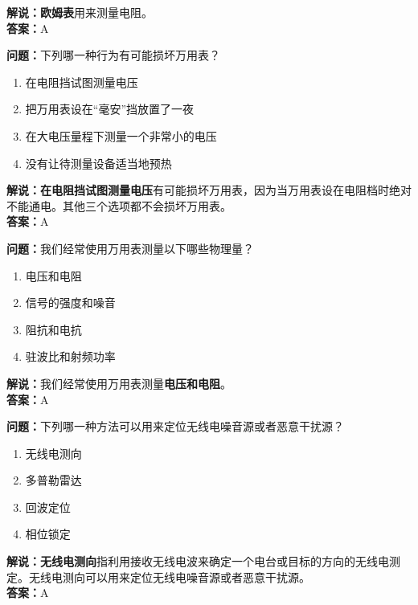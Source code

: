 \textbf{解说：欧姆表}用来测量电阻。\\\textbf{答案：}A


\textbf{问题：}下列哪一种行为有可能损坏万用表？

\begin{enumerate}[label=\Alph*), leftmargin=1cm]
	\item 在电阻挡试图测量电压
	\item 把万用表设在“毫安”挡放置了一夜
	\item 在大电压量程下测量一个非常小的电压
	\item 没有让待测量设备适当地预热
\end{enumerate}

\textbf{解说：在电阻挡试图测量电压}有可能损坏万用表，因为当万用表设在电阻档时绝对不能通电。其他三个选项都不会损坏万用表。\\\textbf{答案：}A%

\textbf{问题：}我们经常使用万用表测量以下哪些物理量？

\begin{enumerate}[label=\Alph*), leftmargin=1cm]
	\item 电压和电阻
	\item 信号的强度和噪音
	\item 阻抗和电抗
	\item 驻波比和射频功率
\end{enumerate}

\textbf{解说：}我们经常使用万用表测量\textbf{电压和电阻}。\\\textbf{答案：}A%


\textbf{问题：}下列哪一种方法可以用来定位无线电噪音源或者恶意干扰源？

\begin{enumerate}[label=\Alph*), leftmargin=1cm]
	\item 无线电测向
	\item 多普勒雷达
	\item 回波定位
	\item 相位锁定
\end{enumerate}

\textbf{解说：无线电测向}指利用接收无线电波来确定一个电台或目标的方向的无线电测定。无线电测向可以用来定位无线电噪音源或者恶意干扰源。\\\textbf{答案：}A%


